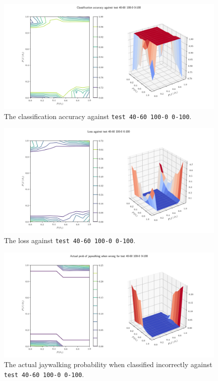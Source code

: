 \documentclass[]{report}
\newcommand{\code}{\texttt}
\begin{document}
% 
% 

\begin{figure}[h]
    \centering
    \centerline{\includegraphics[scale=0.55]{test_40-60_100-0_0-100_accuracy.png}}
    \caption[]{The classification accuracy against \code{test 40-60 100-0 0-100}.}
    \label{fig:test_40-60_100-0_0-100_accuracy_plot}
\end{figure}

\begin{figure}[h]
    \centering
    \centerline{\includegraphics[scale=0.55]{test_40-60_100-0_0-100_loss.png}}
    \caption[]{The loss against \code{test 40-60 100-0 0-100}.}
    \label{fig:test_40-60_100-0_0-100_loss_plot}
\end{figure}

\begin{figure}[h]
    \centering
    \centerline{\includegraphics[scale=0.55]{test_40-60_100-0_0-100_jay_prob.png}}
    \caption[]{The actual jaywalking probability when classified incorrectly against \code{test 40-60 100-0 0-100}.}
    \label{fig:test_40-60_100-0_0-100_jay_prob_plot}
\end{figure}
\end{document}
